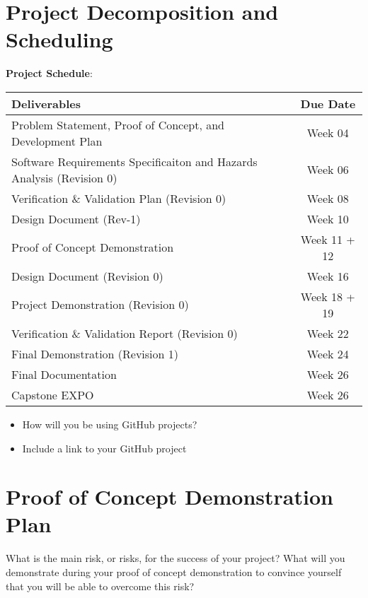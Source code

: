 \documentclass{article}
\begin{document}
\section{Project Decomposition and Scheduling}

\textbf{Project Schedule}:
\begin{center}
  \begin{tabularx}{\textwidth}{Xc}
    \toprule
    \textbf{Deliverables} & \textbf{Due Date} \\
    \midrule
    Problem Statement, Proof of Concept, and Development Plan & Week  04 \\
    Software Requirements Specificaiton and Hazards Analysis (Revision 0) & Week 06 \\
    Verification \& Validation Plan (Revision 0) & Week 08 \\
    Design Document (Rev-1) & Week 10 \\
    Proof of Concept Demonstration & Week 11 + 12 \\
    Design Document (Revision 0) & Week 16 \\
    Project Demonstration (Revision 0) & Week 18 + 19 \\
    Verification \& Validation Report (Revision 0) & Week 22 \\
    Final Demonstration (Revision 1) & Week 24 \\
    Final Documentation & Week 26 \\
    Capstone EXPO & Week 26 \\
    \bottomrule
  \end{tabularx}
\end{center}

\begin{itemize}
  \item How will you be using GitHub projects?
  \item Include a link to your GitHub project
\end{itemize}


\section{Proof of Concept Demonstration Plan}

What is the main risk, or risks, for the success of your project?  What will you
demonstrate during your proof of concept demonstration to convince yourself that
you will be able to overcome this risk?
\end{document}
